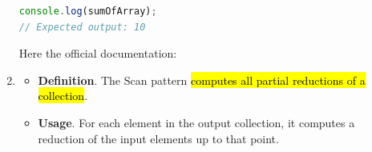\begin{enumerate}
\begin{examplebox}
\begin{lstlisting}[language=JavaScript]
console.log(sumOfArray);
// Expected output: 10\end{lstlisting}
        Here the official documentation:
        \begin{center}
        \end{center}
    \end{examplebox}


    \item {}
    \begin{itemize}
        \item[\textcolor{Red2}{\faIcon{book}}] \textcolor{Red2}{\textbf{Definition}}. The Scan pattern \hl{computes all partial reductions of a collection}.

        \item[\textcolor{Green3}{\faIcon{tools}}] \textcolor{Green3}{\textbf{Usage}}. For each element in the output collection, it computes a reduction of the input elements up to that point.


\end{itemize}
\end{enumerate}
